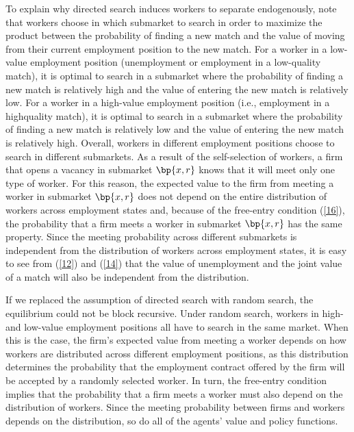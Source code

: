 \documentclass[12pt]{article}
\newcommand{\highlightP}[1]{{\emph{\color{MyPink}{#1}}}}
\theoremstyle{definition}
\begin{document}
\highlightP{The equilibrium is block recursive because searching workers are endogenously separated in different markets, and as in the social planner's problem, such separation is possible only when search is directed.} To explain why directed search induces workers to separate endogenously, note that workers choose in which submarket to search in order to maximize the product between the probability of finding a new match and the value of moving from their current employment position to the new match. For a worker in a low-value employment position (unemployment or employment in a low-quality match), it is optimal to search in a submarket where the probability of finding a new match is relatively high and the value of entering the new match is relatively low. For a worker in a high-value employment position (i.e., employment in a highquality match), it is optimal to search in a submarket where the probability of finding a new match is relatively low and the value of entering the new match is relatively high. Overall, workers in different employment positions choose to search in different submarkets. As a result of the self-selection of workers, a firm that opens a vacancy in submarket $\bp{x, r}$ knows that it will meet only one type of worker. For this reason, the expected value to the firm from meeting a worker in submarket $\bp{x,r}$ does not depend on the entire distribution of workers across employment states and, because of the free-entry condition (\ref{16}), the probability that a firm meets a worker in submarket $\bp{x,r}$ has the same property. Since the meeting probability across different submarkets is independent from the distribution of workers across employment states, it is easy to see from (\ref{12}) and (\ref{14}) that the value of unemployment and the joint value of a match will also be independent from the distribution.

If we replaced the assumption of directed search with random search, the equilibrium could not be block recursive. Under random search, workers in high- and low-value employment positions all have to search in the same market. When this is the case, the firm's expected value from meeting a worker depends on how workers are distributed across different employment positions, as this distribution determines the probability that the employment contract offered by the firm will be accepted by a randomly selected worker. In turn, the free-entry condition implies that the probability that a firm meets a worker must also depend on the distribution of workers. Since the meeting probability between firms and workers depends on the distribution, so do all of the agents' value and policy functions.
\end{document}
